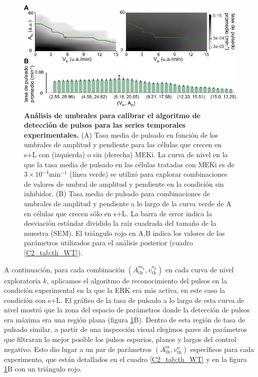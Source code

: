 \documentclass[./main.tex]{subfiles}
\begin{document}
\begin{figure}
    \centering
    \includegraphics[width=1\columnwidth]{figures/chapter2/C2_umbrales.pdf} 
    \caption{\textbf{Análisis de umbrales para calibrar el algoritmo de detección de pulsos para las series temporales experimentales.} (A) Tasa media de pulsado en función de los umbrales de amplitud y pendiente para las células que crecen en s+L con (izquierda) o sin (derecha) MEKi. La curva de nivel en la que la tasa media de pulsado en las células tratadas con MEKi es de $3\times10^{-4} \text{min}^{-1}$ (línea verde) se utilizó para explorar combinaciones de valores de umbral de amplitud y pendiente en la condición sin inhibidor. (B) Tasa media de pulsado para combinaciones de umbrales de amplitud y pendiente a lo largo de la curva verde de A en células que crecen sólo en s+L. La barra de error indica la desviación estándar dividido la raíz cuadrada del tamaño de la muestra (SEM). El triángulo rojo en A,B indica los valores de los parámetros utilizados para el análisis posterior (cuadro \ref{C2_tab:th_WT}).}
    \label{C2_fig:umbrales}
\end{figure}


A continuación, para cada combinación $(A_{\text{th}}^{m_k} , v_{\text{th}}^{n_k})$ en cada curva de nivel exploratoria $k$, aplicamos el algoritmo de reconocimiento del pulsos en la condición experimental en la que la ERK era más activa, en este caso la condición con s+L. El gráfico de la tasa de pulsado a lo largo de esta curva de nivel mostró que la zona del espacio de parámetros donde la detección de pulsos era máxima era una región plana (figura \ref{C2_fig:umbrales}B). Dentro de esta región de tasa de pulsado similar, a partir de una inspección visual elegimos pares de parámetros que filtraran lo mejor posible los pulsos espurios, planos y largos del control negativo. Esto dio lugar a un par de parámetros $(A_{\text{th}}^m , v_{\text{th}}^n)$ específicos para cada experimento, que están detallados en el cuadro \ref{C2_tab:th_WT} y en la figura \ref{C2_fig:umbrales}B con un triángulo rojo.
\end{document}

